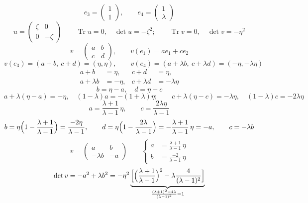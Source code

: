 \documentclass[11pt,a4paper]{article}
\begin{document}
\[
e_3 = \begin{pmatrix} 1 \\ 1 \end{pmatrix}, \qquad
e_4 = \begin{pmatrix} 1 \\ \lambda \end{pmatrix}
\]
\[
\boxed{u = \begin{pmatrix} \zeta & 0 \\ 0 & -\zeta \end{pmatrix}}
\qquad \operatorname{Tr} u = 0, \quad \det u = -\zeta^2;
\qquad \operatorname{Tr} v = 0, \quad \det v = -\eta^2
\]
\[
v = \begin{pmatrix} a & b \\ c & d \end{pmatrix}, \qquad
v(e_1) = a e_1 + c e_2
\]
\[
v(e_3) = (a + b,\ c + d) = (\eta, \eta), \qquad
v(e_4) = (a + \lambda b,\ c + \lambda d) = (-\eta, -\lambda\eta)
\]
\[
\begin{aligned}
a + b &= \eta, & c + d &= \eta, \\
a + \lambda b &= -\eta, & c + \lambda d &= -\lambda\eta
\end{aligned}
\]
\[
b = \eta - a, \quad d = \eta - c
\]
\[
a + \lambda(\eta - a) = -\eta, \quad (1 - \lambda) a = -(1 + \lambda)\eta;
\qquad
c + \lambda(\eta - c) = -\lambda\eta, \quad (1 - \lambda) c = -2\lambda\eta
\]
\[
a = \frac{\lambda + 1}{\lambda - 1}\,\eta, \qquad
c = \frac{2\lambda\eta}{\lambda - 1}
\]
\[
b = \eta\Bigl(1 - \frac{\lambda + 1}{\lambda - 1}\Bigr) = \frac{-2\eta}{\lambda - 1},
\qquad
d = \eta\Bigl(1 - \frac{2\lambda}{\lambda - 1}\Bigr)
= -\frac{\lambda + 1}{\lambda - 1}\,\eta = -a,
\qquad c = -\lambda b
\]
\[
\boxed{v = \begin{pmatrix} a & b \\ -\lambda b & -a \end{pmatrix}}
\qquad
\left\{
\begin{aligned}
a &= \frac{\lambda + 1}{\lambda - 1}\,\eta \\
b &= \frac{-2}{\lambda - 1}\,\eta
\end{aligned}
\right.
\]
\[
\det v = -a^2 + \lambda b^2
= -\eta^2 \underbrace{\Bigl[\Bigl(\frac{\lambda + 1}{\lambda - 1}\Bigr)^2
- \lambda \frac{4}{(\lambda - 1)^2}\Bigr]}_{
\frac{(\lambda + 1)^2 - 4\lambda}{(\lambda - 1)^2} = 1}
\]
\end{document}
